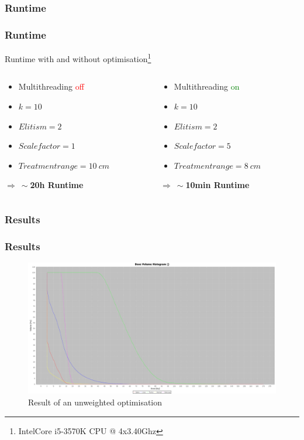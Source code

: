 \documentclass{beamer}
\begin{document}
\subsubsection{Runtime}
\begin{frame}
\frametitle{Runtime}
Runtime with and without optimisation\footnote{Intel\textregistered  Core i5-3570K CPU @ 4x3.40Ghz}
\begin{columns}[T] %
\begin{column}{.48\textwidth}
\begin{itemize}
\item Multithreading \textcolor{red}{off}
\item $k = 10$
\item $Elitism = 2$
\item $Scalefactor = 1$
\item $Treatmentrange = 10 \ cm$
\end{itemize}

 \textbf{$\Rightarrow \ \sim $20h Runtime}
\end{column}%
\hfill%

\begin{column}{.48\textwidth}
\begin{itemize}
\item Multithreading \textcolor{green}{on}
\item $k = 10$
\item $Elitism = 2$
\item $Scalefactor = 5$
\item $Treatmentrange = 8 \ cm$
\end{itemize}

 \textbf{$\Rightarrow \ \sim $10min Runtime}
\end{column}%
\end{columns}
\end{frame}
 
 
\subsubsection{Results}
\begin{frame}
\frametitle{Results}
	\begin{figure}[h]
	\centering
	\includegraphics[width=1\textwidth]{pictures/body1_w1-4-2-3-2}
	\caption{Result of an unweighted optimisation}
	\end{figure}
 
 
\end{frame}  
\end{document}
